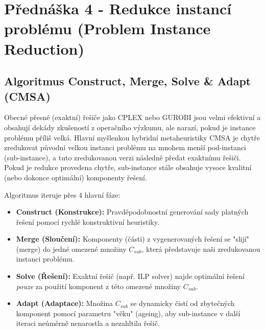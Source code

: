 \documentclass[12pt,a4paper]{article}
\theoremstyle{definition}
\begin{document}
\section{Přednáška 4 - Redukce instancí problému (Problem Instance Reduction)}

\subsection{Algoritmus Construct, Merge, Solve \& Adapt (CMSA)}
Obecné přesné (exaktní) řešiče jako CPLEX nebo GUROBI jsou velmi efektivní a obsahují dekády zkušeností z operačního výzkumu, ale narazí, pokud je instance problému příliš velká. Hlavní myšlenkou hybridní metaheuristiky CMSA je chytře zredukovat původní velkou instanci problému na mnohem menší pod-instanci (sub-instance), a tuto zredukovanou verzi následně předat exaktnímu řešiči. Pokud je redukce provedena chytře, sub-instance stále obsahuje vysoce kvalitní (nebo dokonce optimální) komponenty řešení.

Algoritmus iteruje přes 4 hlavní fáze:
\begin{itemize}
    \item \textbf{Construct (Konstrukce):} Pravděpodobnostní generování sady platných řešení pomocí rychlé konstruktivní heuristiky.
    \item \textbf{Merge (Sloučení):} Komponenty (části) z vygenerovaných řešení se "slijí" (merge) do jedné omezené množiny $C_{sub}$, která představuje naši zredukovanou instanci problému.
    \item \textbf{Solve (Řešení):} Exaktní řešič (např. ILP solver) najde optimální řešení \textit{pouze} za použití komponent z této omezené množiny $C_{sub}$.
    \item \textbf{Adapt (Adaptace):} Množina $C_{sub}$ se dynamicky čistí od zbytečných komponent pomocí parametru "věku" (ageing), aby sub-instance v další iteraci neúměrně nenarostla a nezahltila řešič.
\end{itemize}
\end{document}
